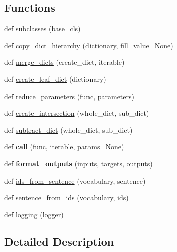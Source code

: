 \subsection*{Functions}
\begin{DoxyCompactItemize}
\item 
def \hyperlink{namespaceutils_a922f4aa89a77cb4f15f389dc948c1baa}{subclasses} (base\+\_\+cls)
\item 
def \hyperlink{namespaceutils_acd3c6169245c003a613f1950b2bc2598}{copy\+\_\+dict\+\_\+hierarchy} (dictionary, fill\+\_\+value=None)
\item 
def \hyperlink{namespaceutils_a0d85856fd9e05d271a285dd7475d0444}{merge\+\_\+dicts} (create\+\_\+dict, iterable)
\item 
def \hyperlink{namespaceutils_abd6e7ecfe8f01c883e250abe18761bbe}{create\+\_\+leaf\+\_\+dict} (dictionary)
\item 
def \hyperlink{namespaceutils_a8e73d42d570349ce513fb05cf6050348}{reduce\+\_\+parameters} (func, parameters)
\item 
def \hyperlink{namespaceutils_a3ed746707b8523e57f3469dfc89ac6ea}{create\+\_\+intersection} (whole\+\_\+dict, sub\+\_\+dict)
\item 
def \hyperlink{namespaceutils_a754f49497d24103d4cd3bb8647967e0d}{subtract\+\_\+dict} (whole\+\_\+dict, sub\+\_\+dict)
\item 
def {\bfseries call} (func, iterable, params=None)\hypertarget{namespaceutils_a86e29e79ca8f768dd36fd4decd1b7bb9}{}\label{namespaceutils_a86e29e79ca8f768dd36fd4decd1b7bb9}

\item 
def {\bfseries format\+\_\+outputs} (inputs, targets, outputs)\hypertarget{namespaceutils_a16c1901df9198850894534c365194fbe}{}\label{namespaceutils_a16c1901df9198850894534c365194fbe}

\item 
def \hyperlink{namespaceutils_aec05c74db04e719df2cd5cea6b24ecad}{ids\+\_\+from\+\_\+sentence} (vocabulary, sentence)
\item 
def \hyperlink{namespaceutils_ad0eaf7c3c6b0e35289a74b3c9945bd82}{sentence\+\_\+from\+\_\+ids} (vocabulary, ids)
\item 
def \hyperlink{namespaceutils_acd5842115fa191b8cd6100485d22ace4}{logging} (logger)
\end{DoxyCompactItemize}


\subsection{Detailed Description}
\begin{DoxyVerb}\end{DoxyVerb}
 

